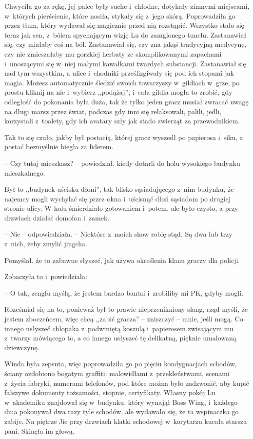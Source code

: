 \documentclass[oneside,polish,11pt,rmheadings]{mwbk}
\begin{document}
Chwyciła go za rękę, jej palce były suche i~chłodne, dotykały zimnymi miejscami, w~których pierścienie, które nosiła, stykały się z~jego skórą. Poprowadziła go przez tłum, który wydawał się magicznie przed nią rozstąpić. Wszystko stało się teraz jak sen, z~bólem spychającym wizję Lu do zamglonego tunelu. Zastanawiał się, czy miałaby coś na ból. Zastanawiał się, czy zna jakąś tradycyjną medycynę, czy nie zmieszałaby mu gorzkiej herbaty ze skomplikowanymi zapachami i~unoszącymi się w~niej małymi kawałkami twardych substancji. Zastanawiał się nad tym wszystkim, a ulice i~chodniki prześlizgiwały się pod ich stopami jak magia. Możesz automatycznie śledzić swoich towarzyszy w~gildiach w~grze, po prostu kliknij na nie i~wybierz ,,podążaj'', i~cała gildia mogła to zrobić, gdy odległość do pokonania była duża, tak że tylko jeden gracz musiał zwracać uwagę na długi marsz przez świat, podczas gdy inni się relaksowali, palili, jedli, korzystali z~toalety, gdy ich avatary szły jak stado zwierząt za przewodnikiem.

Tak to się czuło, jakby był postacią, której gracz wyszedł po papierosa i~siku, a postać bezmyślnie biegła za liderem.

-- Czy tutaj mieszkasz? -- powiedział, kiedy dotarli do holu wysokiego budynku mieszkalnego. 

Był to ,,budynek uścisku dłoni'', tak blisko sąsiadującego z~nim budynku, że najemcy mogli wychylać się przez okna i~uścisnąć dłoń sąsiadom po drugiej stronie ulicy. W holu śmierdziało gotowaniem i~potem, ale było czysto, a przy drzwiach działał domofon i~zamek.

-- Nie -- odpowiedziała. -- Niektóre z~moich show robię stąd. Są dwa lub trzy z~nich, żeby zmylić jingcha. 

Pomyślał, że to zabawne słyszeć, jak używa określenia klanu graczy dla policji. 

Zobaczyła to i~powiedziała: 

-- O tak, zengfu myślą, że jestem bardzo bantai i~zrobiliby mi PK, gdyby mogli. 

Roześmiał się na to, ponieważ był to prawie nieprzenikniony slang, rząd myśli, że jestem zboczeńcem, więc chcą ,,zabić gracza'' -- zniszczyć -- mnie, jeśli mogą. Co innego usłyszeć chłopaka z~podwiniętą koszulą i~papierosem zwisającym mu z~twarzy mówiącego to, a co innego usłyszeć tę delikatną, pięknie umalowaną dziewczynę.

Winda była zepsuta, więc poprowadziła go po pięciu kondygnacjach schodów, ściany ozdobiono bogatym graffiti: malowidłami z~przekleństwami, scenami z~życia fabryki, numerami telefonów, pod które można było zadzwonić, aby kupić fałszywe dokumenty tożsamości, stopnie, certyfikaty. Własny pokój Lu w~akademiku znajdował się w~budynku, który wynajął Boss Wing, i~każdego dnia pokonywał dwa razy tyle schodów, ale wydawało się, że ta wspinaczka go zabije. Na piętrze Jie przy drzwiach klatki schodowej w~korytarzu kucała starsza pani. Skinęła im głową.
\end{document}

